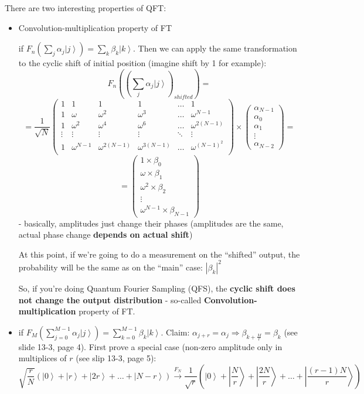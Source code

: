 \documentclass{scrartcl}
\newcommand{\ket}[1]{\left| #1 \right>} %
\newcommand{\means}{\Rightarrow} %
\begin{document}
There are two interesting properties of QFT:
\begin{itemize}
\item Convolution-multiplication property of FT

  if $F_n(\sum \limits_j \alpha_j \ket j) = \sum \limits_k \beta_k \ket k$. Then
  we can apply the same transformation to the cyclic shift of initial position
  (imagine shift by 1 for example):
  $$ F_n((\sum \limits_j \alpha_j \ket j)_{shifted}) = $$ 
$$ = \frac1{\sqrt N} \left(\begin{array}{cccccc}
    1 &  1&  1& 1& \dots & 1 \\
    1 &  \omega & \omega^2 & \omega^3 & \dots & \omega^{N-1} \\
    1 &  \omega^2 & \omega^4 & \omega^6 & \dots & \omega^{2(N-1)} \\
    \vdots & \vdots &  \vdots & \vdots & \ddots & \vdots \\
    1 &  \omega^{N-1} & \omega^{2(N-1)} & \omega^{3(N-1)} & \dots & \omega^{(N-1)^2} \\
  \end{array}\right) \times 
\begin{pmatrix} \alpha_{N-1} \\ \alpha_0 \\ \alpha_1 \\ \vdots \\
  \alpha_{N-2} \end{pmatrix} = $$
$$= \begin{pmatrix} 1 \times \beta_0 \\ \omega \times \beta_1 \\ \omega^2 \times
  \beta_2 \\ \vdots \\ \omega^{N-1} \times \beta_{N-1} \end{pmatrix} $$ -
basically, amplitudes just change their phases (amplitudes are the same, actual
phase change {\bf depends on actual shift})

At this point, if we're going to do a measurement on the ``shifted'' output, the
probability will be the same as on the ``main'' case: $|\beta_k|^2$

So, if you're doing Quantum Fourier Sampling (QFS), the {\bf cyclic shift does
  not change the output distribution} - so-called {\bf
  Convolution-multiplication} property of FT.
\item if $F_M\left(\sum \limits_{j=0}^{M-1} \alpha_j \ket j \right) = \sum
  \limits_{k=0}^{M-1} \beta_k \ket k$. Claim: $\alpha_{j+r} = \alpha_j \means
  \beta_{k+\frac{M}r} = \beta_k$ (see slide 13-3, page 4).
  First prove a special case (non-zero amplitude only in multiplices of $r$ (see
  slip 13-3, page 5): $$\sqrt{\frac r N}(\ket0 + \ket r + \ket {2r} + \dots +
  \ket {N - r}) \xrightarrow{F_N} \frac1{\sqrt r} \left(\ket0 + \ket{\frac N r}
    + \ket{\frac{2N}{r}} + \dots + \ket {\frac{(r-1)N}{r}} \right)$$


\end{itemize}
\end{document}
